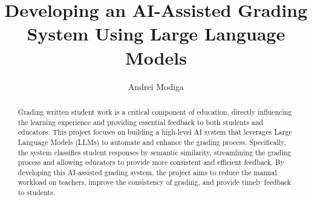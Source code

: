 \documentclass[ms,twoside,print]{nuthesis}
\begin{document}
\frontmatter

\title{Developing an AI-Assisted Grading System Using Large Language Models}
\author{Andrei Modiga}



\maketitle

\begin{abstract}
    Grading written student work is a critical component of education, directly influencing the learning experience and providing essential feedback to both students and educators. This project focuses on building a high-level AI system that leverages Large Language Models (LLMs) to automate and enhance the grading process. Specifically, the system classifies student responses by semantic similarity, streamlining the grading process and allowing educators to provide more consistent and efficient feedback. By developing this AI-assisted grading system, the project aims to reduce the manual workload on teachers, improve the consistency of grading, and provide timely feedback to students.
\end{abstract}
    




\setcounter{tocdepth}{2} %
\tableofcontents
\listoffigures
\listoftables

\mainmatter
\end{document}
